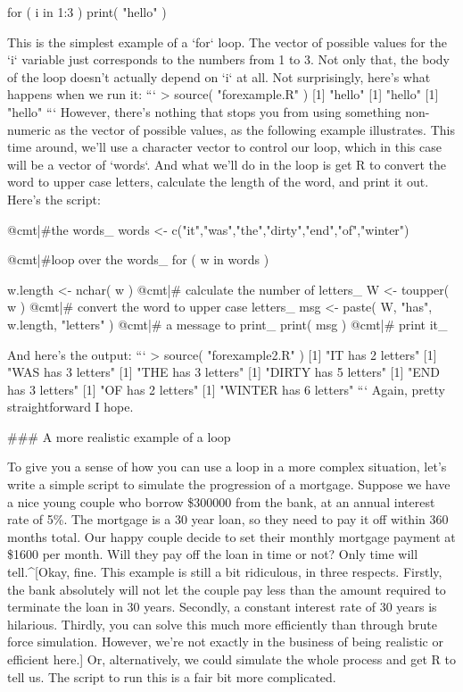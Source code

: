 \begin{script}
for ( i in 1:3 ) {
  print( "hello" )
}
\end{script}
This is the simplest example of a `for` loop. The vector of possible values for the `i` variable just corresponds to the numbers from 1 to 3. Not only that, the body of the loop doesn't actually depend on `i` at all. Not surprisingly, here's what happens when we run it:
```
> source( "forexample.R" )
[1] "hello"
[1] "hello"
[1] "hello"
```
However, there's nothing that stops you from using something non-numeric as the vector of possible values, as the following example illustrates. This time around, we'll use a character vector to control our loop, which in this case will be a vector of `words`. And what we'll do in the loop is get R to convert the word to upper case letters, calculate the length of the word, and print it out. Here's the script: 

\begin{script}
@cmt|#the words_
words <- c("it","was","the","dirty","end","of","winter")

@cmt|#loop over the words_
for ( w in words ) {

  w.length <- nchar( w )     @cmt|# calculate the number of letters_
  W <- toupper( w )          @cmt|# convert the word to upper case letters_
  msg <- paste( W, "has", w.length, "letters" )   @cmt|# a message to print_
  print( msg )               @cmt|# print it_
  
}
\end{script}
And here's the output:
```
> source( "forexample2.R" )
[1] "IT has 2 letters"
[1] "WAS has 3 letters"
[1] "THE has 3 letters"
[1] "DIRTY has 5 letters"
[1] "END has 3 letters"
[1] "OF has 2 letters"
[1] "WINTER has 6 letters"
```
Again, pretty straightforward I hope.

### A more realistic example of a loop

To give you a sense of how you can use a loop in a more complex situation, let's write a simple script to simulate the progression of a mortgage. Suppose we have a nice young couple who borrow \$300000 from the bank, at an annual interest rate of 5\%. The mortgage is a 30 year loan, so they need to pay it off within 360 months total. Our happy couple decide to set their monthly mortgage payment at \$1600 per month. Will they pay off the loan in time or not? Only time will tell.^[Okay, fine. This example is still a bit ridiculous, in three respects. Firstly, the bank absolutely will not let the couple pay less than the amount required to terminate the loan in 30 years. Secondly, a constant interest rate of 30 years is hilarious. Thirdly, you can solve this much more efficiently than through brute force simulation. However, we're not exactly in the business of being realistic or efficient here.] Or, alternatively, we could simulate the whole process and get R to tell us. The script to run this is a fair bit more complicated. 

